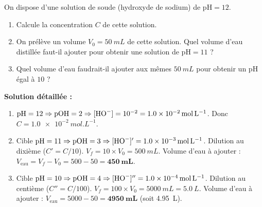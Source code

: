 \documentclass[11pt]{article}
\begin{document}
\begin{exoresolu}
On dispose d'une solution de soude (hydroxyde de sodium) de $\mathrm{pH} = 12$.
\begin{enumerate}
\item Calcule la concentration $C$ de cette solution.
\item On prélève un volume $V_0 = \SI{50}{mL}$ de cette solution. Quel volume d'eau distillée faut-il ajouter pour obtenir une solution de $\mathrm{pH} = 11$ ?
\item Quel volume d'eau faudrait-il ajouter aux mêmes $\SI{50}{mL}$ pour obtenir un pH égal à $10$ ?
\end{enumerate}
\tcblower
\textbf{Solution détaillée :}
\begin{enumerate}
\item $\mathrm{pH} = 12 \Rightarrow \mathrm{pOH} = 2 \Rightarrow [\ce{HO-}] = 10^{-2} = \SI{1,0e-2}{mol.L^{-1}}$. Donc $C = \SI{1,0e-2}{mol.L^{-1}}$.
\item Cible $\mathrm{pH} = 11 \Rightarrow \mathrm{pOH} = 3 \Rightarrow [\ce{HO-}]' = \SI{1,0e-3}{mol.L^{-1}}$.
Dilution au dixième ($C' = C/10$). $V_f = 10 \times V_0 = \SI{500}{mL}$.
Volume d'eau à ajouter : $V_{\text{eau}} = V_f - V_0 = 500 - 50 = \mathbf{\SI{450}{mL}}$.
\item Cible $\mathrm{pH} = 10 \Rightarrow \mathrm{pOH} = 4 \Rightarrow [\ce{HO-}]'' = \SI{1,0e-4}{mol.L^{-1}}$.
Dilution au centième ($C'' = C/100$). $V_f = 100 \times V_0 = \SI{5000}{mL} = \SI{5,0}{L}$.
Volume d'eau à ajouter : $V_{\text{eau}} = 5000 - 50 = \mathbf{\SI{4950}{mL}}$ (soit \SI{4,95}{L}).
\end{enumerate}
\end{exoresolu}
\end{document}
